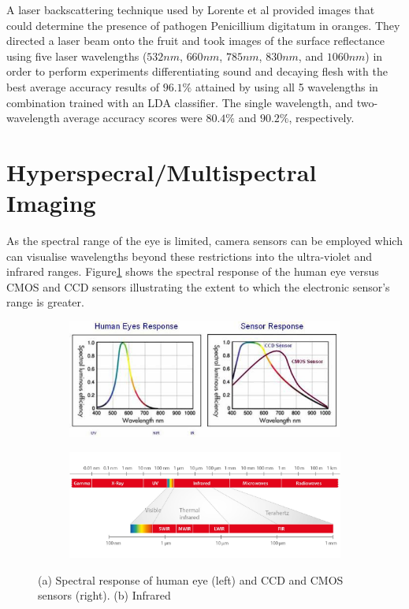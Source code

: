 \documentclass[fleqn,twoside,12pt]{report}
\begin{document}
A laser backscattering technique used by Lorente et al \cite{lorente} provided images that could determine the presence of pathogen Penicillium digitatum in oranges. They directed a laser beam onto the fruit and took images of the surface reflectance using five laser wavelengths ($532nm$, $660nm$, $785nm$, $830nm$, and $1060nm$) in order to perform experiments differentiating sound and decaying flesh with the best average accuracy results of $96.1\%$ attained by using all 5 wavelengths in combination trained with an LDA classifier. The single wavelength, and two-wavelength average accuracy scores were $80.4\%$ and $90.2\%$, respectively.



\section{Hyperspecral/Multispectral Imaging}
\label{sec:lit_hyperspec}

As the spectral range of the eye is limited, camera sensors can be employed which can visualise wavelengths beyond these restrictions into the ultra-violet and infrared ranges. Figure\ref{fig:eye_sensor} shows the spectral response of the human eye versus CMOS and CCD sensors illustrating the extent to which the electronic sensor's range is greater.

\begin{figure}[h]
	\centering
	\begin{subfigure}{.9\textwidth}
		\centering
		\includegraphics[width=0.9\linewidth]{spectralresponse.jpg}
		\caption{}
		\label{fig:eye_sensor}
	\end{subfigure}

	\begin{subfigure}{.9\textwidth}
		\centering
		\includegraphics[width=.9\linewidth]{infra-red.jpg}
		\caption{}
		\label{fig:ifra-red}
	\end{subfigure}%
	\caption{(a) Spectral response of human eye (left) and CCD and CMOS sensors (right). (b) Infrared}
	\label{fig:spectrum}
\end{figure}%
\end{document}
